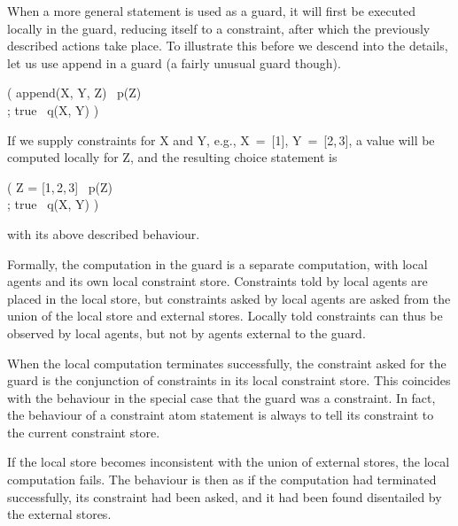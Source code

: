 When a more general statement is used as a guard, it will first be
executed locally in the guard, reducing itself to a constraint, after
which the previously described actions take place.  To illustrate this
before we descend into the details, let us use append in a guard (a
fairly unusual guard though).
%
\begin{progex}
( append(X, Y, Z) \cond\ p(Z) \\
; true \cond\ q(X, Y) )
\end{progex}%
%
If we supply constraints for {\prog X} and {\prog Y}, e.g., {\prog
X~=~[1]}, {\prog Y~=~[2,\,3]}, a value will be computed locally for
{\prog Z}, and the resulting choice statement is
%
\begin{progex}
( Z = [1,\,2,\,3] \cond\ p(Z) \\
; true \cond\ q(X, Y) )
\end{progex}%
%
with its above described behaviour.

Formally, the computation in the guard is a separate computation, with
local agents and its own local constraint store.  Constraints told by
local agents are placed in the local store, but constraints asked by
local agents are asked from the union of the local store and external
stores.  Locally told constraints can thus be observed by local agents,
but not by agents external to the guard.
                                             

When the local computation terminates successfully, the constraint
asked for the guard is the conjunction of constraints in its local
constraint store.  This coincides with the behaviour in the special
case that the guard was a constraint.  In fact, the behaviour of a
constraint atom statement is always to tell its constraint to the
current constraint store.

If the local store becomes inconsistent with the union of external
stores, the local computation fails.  The behaviour is then as if the
computation had terminated successfully, its constraint had been
asked, and it had been found disentailed by the external stores.

